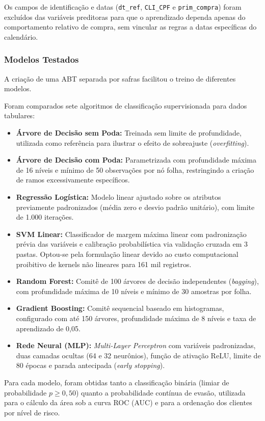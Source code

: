 Os campos de identificação e datas (\texttt{dt\_ref}, \texttt{CLI\_CPF} e \texttt{prim\_compra}) foram excluídos das variáveis preditoras para que o aprendizado dependa apenas do comportamento relativo de compra, sem vincular as regras a datas específicas do calendário.

\subsubsection{Modelos Testados}

A criação de uma ABT separada por safras facilitou o treino de diferentes modelos.

Foram comparados sete algoritmos de classificação supervisionada para dados tabulares:

\begin{itemize}[leftmargin=*]
    \item \textbf{Árvore de Decisão sem Poda:} Treinada sem limite de profundidade, utilizada como referência para ilustrar o efeito de sobreajuste (\textit{overfitting}).
    \item \textbf{Árvore de Decisão com Poda:} Parametrizada com profundidade máxima de 16 níveis e mínimo de 50 observações por nó folha, restringindo a criação de ramos excessivamente específicos.
    \item \textbf{Regressão Logística:} Modelo linear ajustado sobre os atributos previamente padronizados (média zero e desvio padrão unitário), com limite de 1.000 iterações.
    \item \textbf{SVM Linear:} Classificador de margem máxima linear com padronização prévia das variáveis e calibração probabilística via validação cruzada em 3 pastas. Optou-se pela formulação linear devido ao custo computacional proibitivo de kernels não lineares para 161 mil registros.
    \item \textbf{Random Forest:} Comitê de 100 árvores de decisão independentes (\textit{bagging}), com profundidade máxima de 10 níveis e mínimo de 30 amostras por folha.
    \item \textbf{Gradient Boosting:} Comitê sequencial baseado em histogramas, configurado com até 150 árvores, profundidade máxima de 8 níveis e taxa de aprendizado de 0,05.
    \item \textbf{Rede Neural (MLP):} \textit{Multi-Layer Perceptron} com variáveis padronizadas, duas camadas ocultas (64 e 32 neurônios), função de ativação ReLU, limite de 80 épocas e parada antecipada (\textit{early stopping}).
\end{itemize}

Para cada modelo, foram obtidas tanto a classificação binária (limiar de probabilidade $p \ge 0,50$) quanto a probabilidade contínua de evasão, utilizada para o cálculo da área sob a curva ROC (AUC) e para a ordenação dos clientes por nível de risco.
